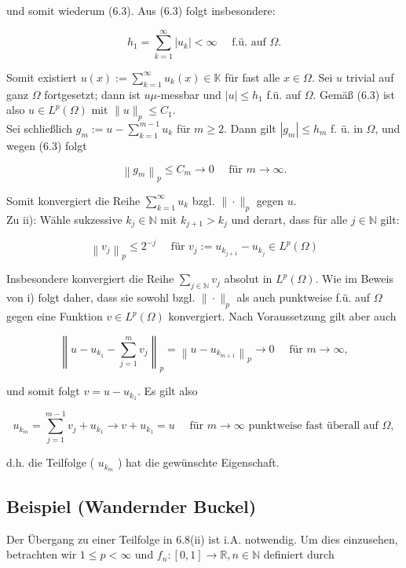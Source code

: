 \documentclass[10pt, letterpaper]{article}
\begin{document}
und somit wiederum (6.3). Aus (6.3) folgt insbesondere:

$$
h_{1}=\sum_{k=1}^{\infty}\left|u_{k}\right|<\infty \quad \text { f.ü. auf } \Omega .
$$

Somit existiert $u(x):=\sum_{k=1}^{\infty} u_{k}(x) \in \mathbb{K}$ für fast alle $x \in \Omega$. Sei $u$ trivial auf ganz $\Omega$ fortgesetzt; dann ist $u \mu$-messbar und $|u| \leq h_{1}$ f.ü. auf $\Omega$. Gemäß (6.3) ist also $u \in L^{p}(\Omega)$ mit $\|u\|_{p} \leq C_{1}$.\\
Sei schließlich $g_{m}:=u-\sum_{k=1}^{m-1} u_{k}$ für $m \geq 2$. Dann gilt $\left|g_{m}\right| \leq h_{m}$ f. ü. in $\Omega$, und wegen (6.3) folgt

$$
\left\|g_{m}\right\|_{p} \leq C_{m} \rightarrow 0 \quad \text { für } m \rightarrow \infty .
$$

Somit konvergiert die Reihe $\sum_{k=1}^{\infty} u_{k}$ bzgl. $\|\cdot\|_{p}$ gegen $u$.\\
Zu ii): Wähle sukzessive $k_{j} \in \mathbb{N}$ mit $k_{j+1}>k_{j}$ und derart, dass für alle $j \in \mathbb{N}$ gilt:

$$
\left\|v_{j}\right\|_{p} \leq 2^{-j} \quad \text { für } v_{j}:=u_{k_{j+1}}-u_{k_{j}} \in L^{p}(\Omega)
$$

Insbesondere konvergiert die Reihe $\sum_{j \in \mathbb{N}} v_{j}$ absolut in $L^{p}(\Omega)$. Wie im Beweis von i) folgt daher, dass sie sowohl bzgl. $\|\cdot\|_{p}$ als auch punktweise f.ü. auf $\Omega$ gegen eine Funktion $v \in L^{p}(\Omega)$ konvergiert. Nach Voraussetzung gilt aber auch

$$
\left\|u-u_{k_{1}}-\sum_{j=1}^{m} v_{j}\right\|_{p}=\left\|u-u_{k_{m+1}}\right\|_{p} \rightarrow 0 \quad \text { für } m \rightarrow \infty,
$$

und somit folgt $v=u-u_{k_{1}}$. Es gilt also

$$
u_{k_{m}}=\sum_{j=1}^{m-1} v_{j}+u_{k_{1}} \rightarrow v+u_{k_{1}}=u \quad \text { für } m \rightarrow \infty \text { punktweise fast überall auf } \Omega,
$$

d.h. die Teilfolge ( $u_{k_{m}}$ ) hat die gewünschte Eigenschaft.

\subsection*{Beispiel (Wandernder Buckel)}
Der Übergang zu einer Teilfolge in 6.8(ii) ist i.A. notwendig. Um dies einzusehen, betrachten wir $1 \leq p<\infty$ und $f_{n}:[0,1] \rightarrow \mathbb{R}, n \in \mathbb{N}$ definiert durch
\end{document}

